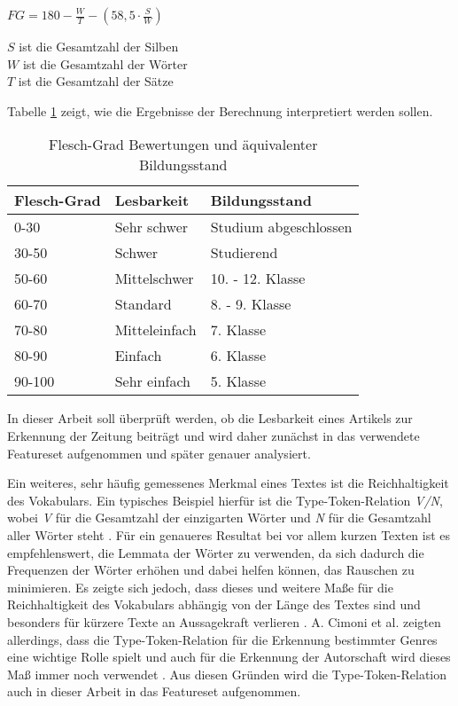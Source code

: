 \(FG = 180 - \frac{W}{T} - (58,5 \cdot \frac{S}{W})\)

$ S $ ist die Gesamtzahl der Silben\\
$ W $ ist die Gesamtzahl der Wörter\\
$ T $ ist die Gesamtzahl der Sätze

Tabelle \ref{fleschgrad} zeigt, wie die Ergebnisse der Berechnung interpretiert werden sollen.

\begin{table}[h]
\centering
\begin{tabular}[t]{lll}
\toprule
Flesch-Grad & Lesbarkeit & Bildungsstand\\
\midrule
0-30 & Sehr schwer & Studium abgeschlossen\\
30-50 & Schwer & Studierend\\
50-60 & Mittelschwer & 10. - 12. Klasse\\
60-70 & Standard & 8. - 9. Klasse\\
70-80 & Mitteleinfach & 7. Klasse\\
80-90 & Einfach & 6. Klasse\\
90-100 & Sehr einfach & 5. Klasse\\
\bottomrule
\end{tabular}
\caption{Flesch-Grad Bewertungen und äquivalenter Bildungsstand \cite[S.~406]{courtis2002reading}}
\label{fleschgrad}
\end{table}

In dieser Arbeit soll überprüft werden, ob die Lesbarkeit eines Artikels zur Erkennung der Zeitung beiträgt und wird daher zunächst in das verwendete Featureset aufgenommen und später genauer analysiert.

Ein weiteres, sehr häufig gemessenes Merkmal eines Textes ist die Reichhaltigkeit des Vokabulars. Ein typisches Beispiel hierfür ist die Type-Token-Relation \textit{V/N}, wobei \textit{V} für die Gesamtzahl der einzigarten Wörter und \textit{N} für die Gesamtzahl aller Wörter steht \cite[S.~540]{stamatatos2009survey}. Für ein genaueres Resultat bei vor allem kurzen Texten ist es empfehlenswert, die Lemmata der Wörter zu verwenden, da sich dadurch die Frequenzen der Wörter erhöhen und dabei helfen können, das Rauschen zu minimieren. Es zeigte sich jedoch, dass dieses und weitere Maße für die Reichhaltigkeit des Vokabulars abhängig von der Länge des Textes sind und besonders für kürzere Texte an Aussagekraft verlieren \cite{tweedie1998variable}. A. Cimoni et al. zeigten allerdings, dass die Type-Token-Relation für die Erkennung bestimmter Genres eine wichtige Rolle spielt \cite[S.~5]{cimino2017identifying} und auch für die Erkennung der Autorschaft wird dieses Maß immer noch verwendet \cite[S.~540]{stamatatos2009survey}. Aus diesen Gründen wird die Type-Token-Relation auch in dieser Arbeit in das Featureset aufgenommen.

